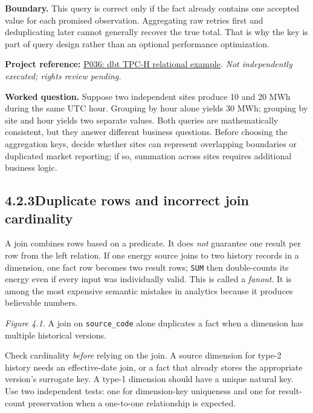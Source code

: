 \documentclass[11pt,twoside]{article}
\newcommand{\topic}[2]{\subsection*{#1\quad #2}}
\newcommand{\repo}[2]{\par\begingroup\fontsize{8.0}{9.6}\selectfont\sffamily\color{inkgray}\textbf{Project reference:} \href{#2}{#1}. \textit{Not independently executed; rights review pending.}\par\endgroup}
\begin{document}
\textbf{Boundary.} This query is correct only if the fact already contains one accepted value for each promised observation. Aggregating raw retries first and deduplicating later cannot generally recover the true total. That is why the key is part of query design rather than an optional performance optimization.
\repo{P036: dbt TPC-H relational example}{https://github.com/clausherther/dbt-tpch}


\textbf{Worked question.} Suppose two independent sites produce 10 and 20 MWh during the same UTC hour. Grouping by hour alone yields 30 MWh; grouping by site and hour yields two separate values. Both queries are mathematically consistent, but they answer different business questions. Before choosing the aggregation keys, decide whether sites can represent overlapping boundaries or duplicated market reporting; if so, summation across sites requires additional business logic.

\newpage
\topic{4.2.3}{Duplicate rows and incorrect join cardinality}
A join combines rows based on a predicate. It does \emph{not} guarantee one result per row from the left relation. If one energy source joins to two history records in a dimension, one fact row becomes two result rows; \texttt{SUM} then double-counts its energy even if every input was individually valid. This is called a \emph{fanout}. It is among the most expensive semantic mistakes in analytics because it produces believable numbers.

\begin{center}
\end{center}
\textit{Figure 4.1.} A join on \texttt{source\_code} alone duplicates a fact when a dimension has multiple historical versions.

Check cardinality \emph{before} relying on the join. A source dimension for type-2 history needs an effective-date join, or a fact that already stores the appropriate version's surrogate key. A type-1 dimension should have a unique natural key. Use two independent tests: one for dimension-key uniqueness and one for result-count preservation when a one-to-one relationship is expected.
\end{document}
